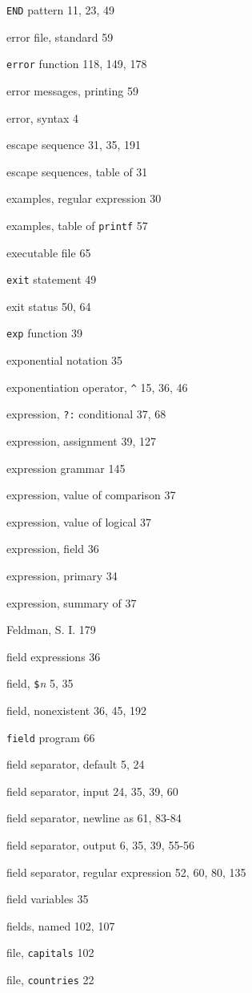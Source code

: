 \begin{multicols}{3}
\verb'END' pattern 11, 23, 49

error file, standard 59

\verb'error' function 118, 149, 178

error messages, printing 59

error, syntax 4

escape sequence 31, 35, 191

escape sequences, table of 31

examples, regular expression 30

examples, table of \verb'printf' 57

executable file 65

\verb'exit' statement 49

exit status 50, 64

\verb'exp' function 39

exponential notation 35

exponentiation operator, \verb'^' 15, 36, 46

expression, \verb'?:' conditional 37, 68

expression, assignment 39, 127

expression grammar 145

expression, value of comparison 37

expression, value of logical 37

expression, field 36

expression, primary 34

expression, summary of 37

Feldman, S. I. 179

field expressions 36

field, \verb'$'\textit{n} 5, 35

field, nonexistent 36, 45, 192

\verb'field' program 66

field separator, default 5, 24

field separator, input 24, 35, 39, 60

field separator, newline as 61, 83-84

field separator, output 6, 35, 39, 55-56

field separator, regular expression 52, 60, 80, 135

field variables 35

fields, named 102, 107

file, \verb'capitals' 102

file, \verb'countries' 22


\end{multicols}
